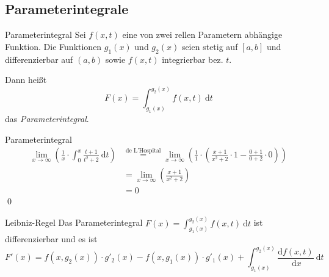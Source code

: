 \documentclass[german]{../spicker}
\newcommand{\dx}{~\mathrm{d}x}
\newcommand{\dt}{~\mathrm{d}t}
\begin{document}
\subsection{Parameterintegrale}

\begin{defi}{Parameterintegral}
    Sei $f(x, t)$ eine von zwei rellen Parametern abhängige Funktion.
    Die Funktionen $g_1(x)$ und $g_2(x)$ seien stetig auf $[a, b]$ und differenzierbar auf $(a, b)$ sowie $f(x, t)$ integrierbar bez. $t$.

    Dann heißt
    $$
        F(x) = \int^{g_2(x)}_{g_1(x)} f(x, t) \dt
    $$
    das \emph{Parameterintegral}.
\end{defi}

\begin{example}{Parameterintegral}
    $$
        \begin{aligned}
            \lim_{x\to\infty} \left( \frac{1}{x} \cdot \int_0^x \frac{t+1}{t^2 + 2} \dt\right)
             & \overset{\text{de L'Hospital}}={} \lim_{x\to\infty} \left( \frac{1}{1} \cdot \left( \frac{x+1}{x^2 + 2} \cdot 1 - \frac{0+1}{0+2} \cdot 0 \right)\right) \\
             & ={} \lim_{x\to\infty} \left( \frac{x+1}{x^2 + 2} \right)                                                                                                 \\
             & ={} 0
        \end{aligned}
    $$\qed
\end{example}

\begin{defi}{Leibniz-Regel}
    Das Parameterintegral $F(x) = \int^{g_2(x)}_{g_1(x)} f(x, t) \dt$ ist differenzierbar und es ist
    $$
        F'(x) = f(x, g_2(x)) \cdot g'_2(x) - f(x, g_1(x)) \cdot g'_1(x) + \int^{g_2(x)}_{g_1(x)} \frac{\mathrm{d} f(x, t)}{\dx}\dt
    $$
\end{defi}
\end{document}
